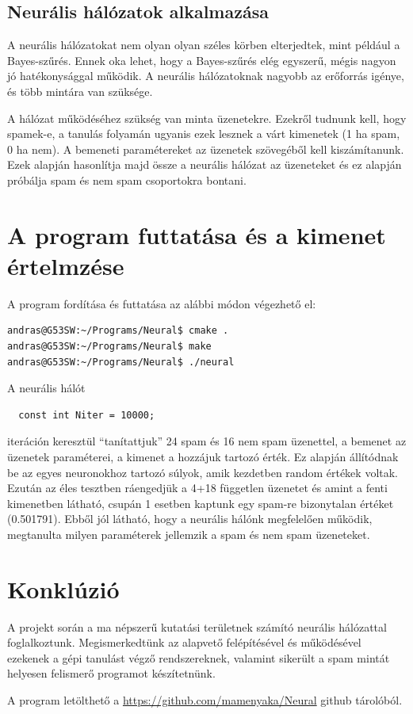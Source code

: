 \documentclass[a4paper]{article}
\begin{document}
\subsection{Neurális hálózatok alkalmazása}
A neurális hálózatokat nem olyan olyan széles körben elterjedtek, mint például a Bayes-szűrés. Ennek oka lehet, hogy a Bayes-szűrés elég egyszerű, mégis nagyon jó hatékonysággal működik. A neurális hálózatoknak nagyobb az erőforrás igénye, és több mintára van szüksége.

A hálózat működéséhez szükség van minta üzenetekre. Ezekről tudnunk kell, hogy spamek-e, a tanulás folyamán ugyanis ezek lesznek a várt kimenetek (1 ha spam, 0 ha nem). A bemeneti paramétereket az üzenetek szövegéből kell kiszámítanunk. Ezek alapján hasonlítja majd össze a neurális hálózat az üzeneteket és ez alapján próbálja spam és nem spam csoportokra bontani.

\section{A program futtatása és a kimenet értelmzése}

A program fordítása és futtatása az alábbi módon végezhető el:

\lstset{language=Bash}
\begin{lstlisting}
andras@G53SW:~/Programs/Neural$ cmake .
andras@G53SW:~/Programs/Neural$ make
andras@G53SW:~/Programs/Neural$ ./neural
\end{lstlisting}



A neurális hálót

\lstset{language=C++}
\begin{lstlisting}
  const int Niter = 10000;
\end{lstlisting}
iteráción keresztül ``tanítattjuk'' 24 spam és 16 nem spam üzenettel, a bemenet az üzenetek paraméterei, a kimenet a hozzájuk tartozó  érték. Ez alapján állítódnak be az egyes neuronokhoz tartozó súlyok, amik kezdetben random értékek voltak. Ezután az éles tesztben ráengedjük a 4+18 független üzenetet és amint a fenti kimenetben látható, csupán 1 esetben kaptunk egy spam-re bizonytalan értéket (0.501791). Ebből jól látható, hogy a neurális hálónk megfelelően működik, megtanulta milyen paraméterek jellemzik a spam és nem spam üzeneteket.

\section{Konklúzió}
A projekt során a ma népszerű kutatási területnek számító neurális hálózattal foglalkoztunk. Megismerkedtünk az alapvető felépítésével és működésével ezekenek a gépi tanulást végző rendszereknek, valamint sikerült a spam mintát helyesen felismerő programot készítetnünk.

A program letölthető a \url{https://github.com/mamenyaka/Neural} github tárolóból.
\end{document}
